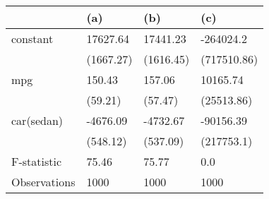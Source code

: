 \begin{tabular}{llll}
\toprule
{} &        (a) &        (b) &          (c) \\
\midrule
constant     &   17627.64 &   17441.23 &    -264024.2 \\
             &  (1667.27) &  (1616.45) &  (717510.86) \\
mpg          &     150.43 &     157.06 &     10165.74 \\
             &    (59.21) &    (57.47) &   (25513.86) \\
car(sedan)   &   -4676.09 &   -4732.67 &    -90156.39 \\
             &   (548.12) &   (537.09) &   (217753.1) \\
F-statistic  &      75.46 &      75.77 &          0.0 \\
Observations &       1000 &       1000 &         1000 \\
\bottomrule
\end{tabular}
